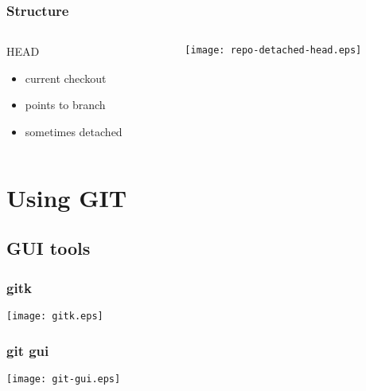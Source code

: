 \documentclass[english]{beamer}
\newcommand{\mysection}[2]{%
  \hypertarget{#2}{}%
  \section{#1}%
  \label{#2}%
}
\newcommand{\mysubsection}[2]{%
  \hypertarget{#2}{}%
  \subsection{#1}%
  \label{#2}%
}
\begin{document}
\begin{frame}
\frametitle{Structure}
\begin{columns}[t]
        \begin{column}[T]{.5\textwidth}
                HEAD
                \begin{itemize}
                        \item current checkout
                        \item points to branch
                        \item sometimes detached
                \end{itemize}
        \end{column}
        \begin{column}[T]{.5\textwidth}
                \texttt{[image: repo-detached-head.eps]}
        \end{column}
\end{columns}

\end{frame}


\mysection{Using GIT}{_using_git}

\mysubsection{GUI tools}{using:gui}
\begin{frame}[fragile]
\frametitle{gitk}

\begin{center}
\texttt{[image: gitk.eps]}
\end{center}

\end{frame}

\begin{frame}[fragile]
\frametitle{git gui}

\begin{center}
\texttt{[image: git-gui.eps]}
\end{center}

\end{frame}
\end{document}

